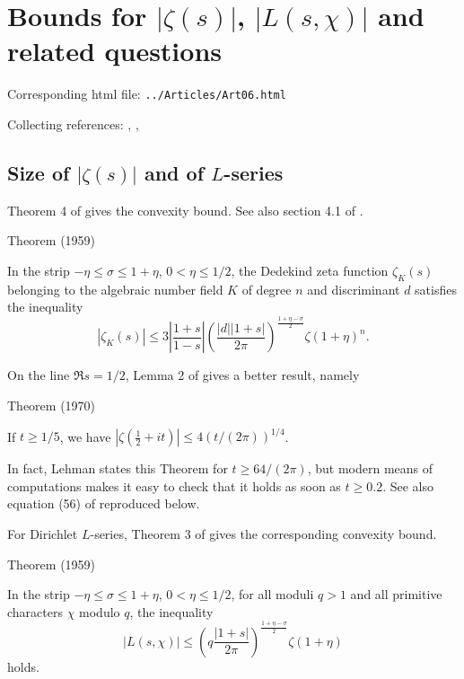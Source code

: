 \chapter{   Bounds for $|\zeta(s)|$, $|L(s,\chi)|$ and related questions}

Corresponding html file: \texttt{../Articles/Art06.html}









Collecting references:
\cite{Trudgian*11},
\cite{Kadiri-Ng*12},

 
 

\par 
\section{Size of $|\zeta(s)|$ and of $L$-series}



Theorem 4 of \cite{Rademacher*59} gives
the convexity bound. See also section 4.1 of \cite{Trudgian*13}.
\par 
\begin{thm}{Theorem (1959)}

In the strip $-\eta\le \sigma\le 1+\eta$, $0 < \eta\le 1/2$, the Dedekind zeta
function $\zeta_K(s)$ belonging to the algebraic number field $K$ of degree
$n$ and discriminant $d$ satisfies the inequality
$$
|\zeta_K(s)|\le 3 \left|\frac{1+s}{1-s}\right|
\left(\frac{|d||1+s|}{2\pi}\right)^{\frac{1+\eta-\sigma}{2}}
\zeta(1+\eta)^n.
$$
\end{thm}


On the line $\Re s=1/2$, Lemma 2 of
\cite{Lehman*70} gives a better
result, namely
\par 
\begin{thm}{Theorem (1970)}

If $t\ge 1/5$, we have
$
|\zeta(\tfrac12+it)|\le 4 (t/(2\pi))^{1/4}
$.
\end{thm}

In fact, Lehman states this Theorem for $t\ge 64/(2\pi)$, but modern means of
computations makes it easy to check that it holds as soon as $t\ge 0.2$.
See also equation (56)
of \cite{Backlund*18} reproduced below.

For Dirichlet $L$-series, Theorem 3
of \cite{Rademacher*59} gives 
the corresponding convexity bound.
\par 
\begin{thm}{Theorem (1959)}

In the strip $-\eta\le \sigma\le 1+\eta$, $0 < \eta\le 1/2$, for all moduli $q
> 1$ and all primitive
characters $\chi$ modulo $q$, the inequality 
$$
|L(s,\chi)|\le  
\left(q\frac{|1+s|}{2\pi}\right)^{\frac{1+\eta-\sigma}{2}}
\zeta(1+\eta)
$$
holds.
\end{thm}

